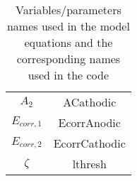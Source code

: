 \documentclass[11pt]{article}
\begin{document}
\begin{table}[h]
\begin{center}
\begin{tabular}{|c|c|}
 $A_2$                      &ACathodic                           \\
 $E_{corr,1}$               &EcorrAnodic                         \\
 $E_{corr,2}$               &EcorrCathodic                       \\
 $\zeta$                    &lthresh                             \\
 \hline
\end{tabular}
\caption{Variables/parameters names used in the model equations and the corresponding names used in the code}
\end{center}
\end{table}
\end{document}
